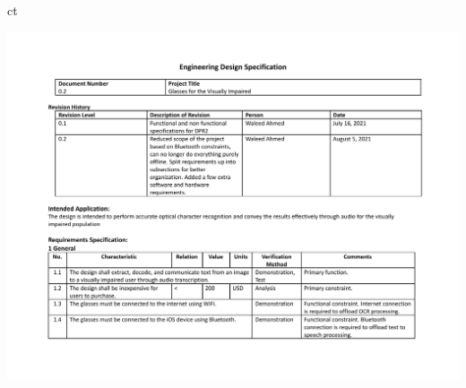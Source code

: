 ct\documentclass[a4paper,11pt]{article}
\begin{document}
\begin{landscape}
\begin{center}
        \includegraphics[page=3,width={0.86\linewidth}]{pdf/eds_0.2.pdf}
    \end{center}
    
    \newpage

\end{landscape}
\end{document}
